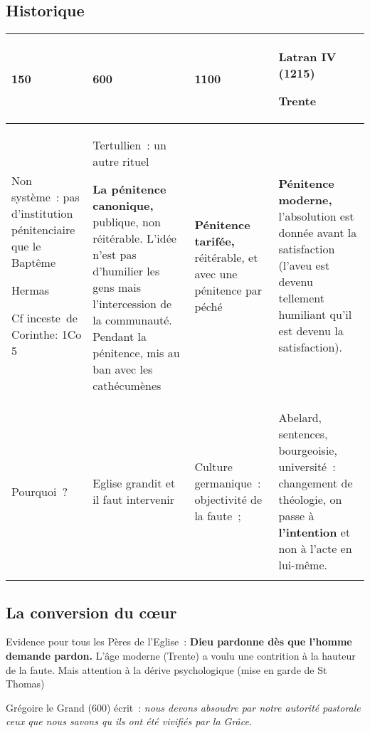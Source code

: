 \hypertarget{historique}{%
\subsection{Historique}\label{historique}}



\begin{table}[h!]
    \centering
 \footnotesize
\begin{tabular}{p{}p{}p{}p{}}
\toprule
150 & 600 & 1100 & Latran IV (1215)

Trente \\
\midrule
Non système~: pas d'institution pénitenciaire que le Baptême

Hermas

Cf inceste~de Corinthe: 1Co 5 & Tertullien~: un autre rituel

\textbf{La pénitence canonique,} publique, non réitérable. L'idée n'est
pas d'humilier les gens mais l'intercession de la communauté. Pendant la
pénitence, mis au ban avec les cathécumènes & \textbf{Pénitence
tarifée,} réitérable, et avec une pénitence par péché &
\textbf{Pénitence moderne,} l'absolution est donnée avant la
satisfaction (l'aveu est devenu tellement humiliant qu'il est devenu la
satisfaction). \\
Pourquoi~? & Eglise grandit et il faut intervenir & Culture germanique~:
objectivité de la faute~; & Abelard, sentences, bourgeoisie,
université~: changement de théologie, on passe à \textbf{l'intention} et
non à l'acte en lui-même. \\
 
\\
\bottomrule
\end{tabular}
\label{tab:my_label}
\end{table}


\hypertarget{la-conversion-du-cux153ur}{%
\subsection{La conversion du cœur}\label{la-conversion-du-cux153ur}}

Evidence pour tous les Pères de l'Eglise~: \textbf{Dieu pardonne dès que
l'homme demande pardon.} L'âge moderne (Trente) a voulu une contrition à
la hauteur de la faute. Mais attention à la dérive psychologique (mise
en garde de St Thomas)

Grégoire le Grand (600) écrit~: \emph{nous devons absoudre par notre
autorité pastorale ceux que nous savons qu ils ont été vivifiés par la
Grâce.}

